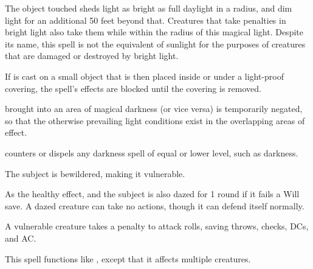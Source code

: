 \spellrng{\rngtouch}
\begin{spelleffect}
  The object touched sheds light as bright as full daylight in a \arealarge radius, and dim light for an additional 50 feet beyond that. Creatures that take penalties in bright light also take them while within the radius of this magical light. Despite its name, this spell is not the equivalent of sunlight for the purposes of creatures that are damaged or destroyed by bright light.
  \par If  is cast on a small object that is then placed inside or under a light-proof covering, the spell's effects are blocked until the covering is removed.
\end{spelleffect}
\begin{spellnotes}
   brought into an area of magical darkness (or vice versa) is temporarily negated, so that the otherwise prevailing light conditions exist in the overlapping areas of effect.
  \par {} counters or dispels any darkness spell of equal or lower level, such as darkness.
\end{spellnotes}

\spellrng{\rngmed}
\spelldur{\durshort}
\begin{spellhealthy}
  The subject is bewildered, making it vulnerable.
\end{spellhealthy}
\begin{spellblood}
  As the healthy effect, and the subject is also dazed for 1 round if it fails a Will save. A dazed creature can take no actions, though it can defend itself normally.
\end{spellblood}
\begin{spellnotes}
  A vulnerable creature takes a  penalty to attack rolls, saving throws, checks, DCs, and AC.
\end{spellnotes}

\spellrng{\rngmed}
\begin{spelleffect}
  This spell functions like , except that it affects multiple creatures.
\end{spelleffect}

